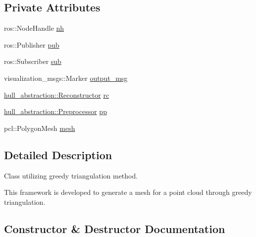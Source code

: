 \subsection*{Private Attributes}
\begin{DoxyCompactItemize}
\item 
ros\+::\+Node\+Handle \hyperlink{classgreedy__triangulation__node_1_1_greedy_triangulation_a33c0f88cc59f8eb2bf5e09382a65e991}{nh}
\item 
ros\+::\+Publisher \hyperlink{classgreedy__triangulation__node_1_1_greedy_triangulation_abca7e84377eaee40cd99f33a1c75146f}{pub}
\item 
ros\+::\+Subscriber \hyperlink{classgreedy__triangulation__node_1_1_greedy_triangulation_adab5bb6a0e615bbb36ea53d1fa4e279a}{sub}
\item 
visualization\+\_\+msgs\+::\+Marker \hyperlink{classgreedy__triangulation__node_1_1_greedy_triangulation_a87417732cd72c77cce60c58dc0a39076}{output\+\_\+msg}
\item 
\hyperlink{classhull__abstraction_1_1_reconstructor}{hull\+\_\+abstraction\+::\+Reconstructor} \hyperlink{classgreedy__triangulation__node_1_1_greedy_triangulation_a7b95cdf57121ac4cdc5e5d8115a7c598}{rc}
\item 
\hyperlink{classhull__abstraction_1_1_preprocessor}{hull\+\_\+abstraction\+::\+Preprocessor} \hyperlink{classgreedy__triangulation__node_1_1_greedy_triangulation_acfff8052bccf50852690aef57800a443}{pp}
\item 
pcl\+::\+Polygon\+Mesh \hyperlink{classgreedy__triangulation__node_1_1_greedy_triangulation_a569d95963837370acb71c6427022b8fc}{mesh}
\end{DoxyCompactItemize}


\subsection{Detailed Description}
Class utilizing greedy triangulation method. 

This framework is developed to generate a mesh for a point cloud through greedy triangulation. 

\subsection{Constructor \& Destructor Documentation}
